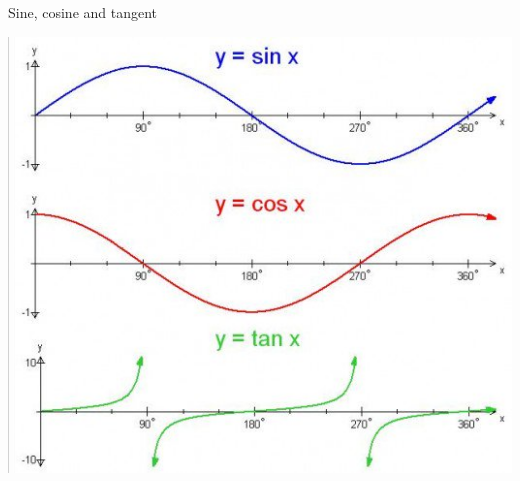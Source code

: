\begin{frame}{Sine, cosine and tangent}
    \begin{center}
    	\includegraphics[width=0.8\textheight]{sin_cos_tan_graph}
	\end{center}
\end{frame}

